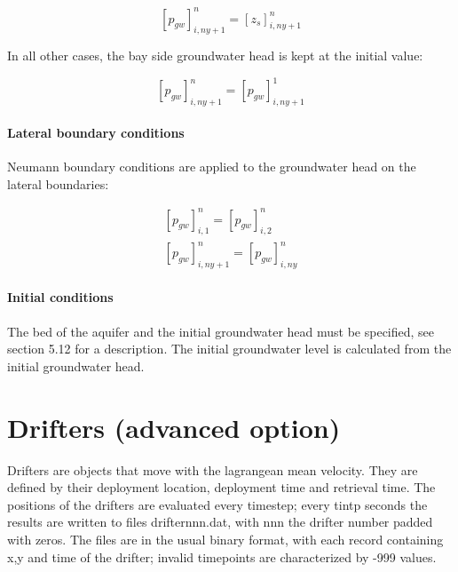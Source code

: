 \begin{equation} \label{2.100)} 
\left[p_{gw} \right]_{i,ny+1}^{n} =\left[z_{s} \right]_{i,ny+1}^{n}  
\end{equation} 

In all other cases, the bay side groundwater head is kept at the initial value:

\begin{equation} \label{2.101)} 
\left[p_{gw} \right]_{i,ny+1}^{n} =\left[p_{gw} \right]_{i,ny+1}^{1}  
\end{equation} 

\paragraph{Lateral boundary conditions}

Neumann boundary conditions are applied to the groundwater head on the lateral boundaries:

\begin{equation} \label{2.102)} 
\begin{array}{l} {\left[p_{gw} \right]_{i,1}^{n} =\left[p_{gw} \right]_{i,2}^{n} } \\ {\left[p_{gw} \right]_{i,ny+1}^{n} =\left[p_{gw} \right]_{i,ny}^{n} } \end{array} 
\end{equation} 

\paragraph{Initial conditions}

The bed of the aquifer and the initial groundwater head must be specified, see section 5.12 for a description. The initial groundwater level is calculated from the initial groundwater head.

\section{ Drifters (advanced option)}

Drifters are objects that move with the lagrangean mean velocity. They are defined by their deployment location, deployment time and retrieval time.  The positions of the drifters are evaluated every timestep; every tintp seconds the results are written to files drifternnn.dat, with nnn the drifter number padded with zeros. The files are in the usual binary format, with each record containing x,y and time of the drifter; invalid timepoints are characterized by -999 values.


